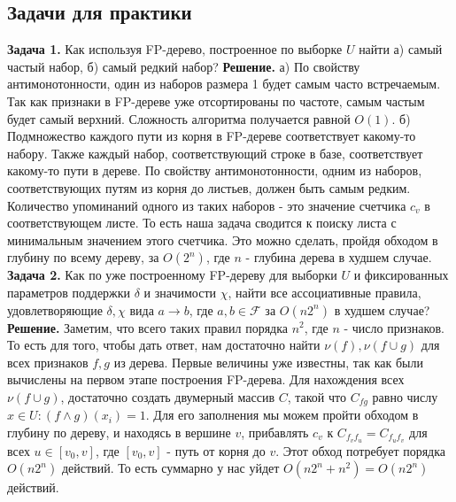 \subsection{Задачи для практики}
\textbf{Задача 1.} Как используя FP-дерево, построенное по выборке $U$ найти а) самый частый набор, б) самый редкий набор?
\newline\newline
\textbf{Решение.}
\newline
а) По свойству антимонотонности, один из наборов размера 1 будет самым часто встречаемым. Так как признаки в FP-дереве уже отсортированы по частоте, самым частым будет самый верхний. Сложность алгоритма получается равной $O(1)$.
\newline
б) Подмножество каждого пути из корня в FP-дереве соответствует какому-то набору. Также каждый набор, соответствующий строке в базе, соответствует какому-то пути в дереве. По свойству антимонотонности, одним из наборов, соответствующих путям из корня до листьев, должен быть самым редким. Количество упоминаний одного из таких наборов - это значение счетчика $c_v$ в соответствующем листе. То есть наша задача сводится к поиску листа с минимальным значением этого счетчика. Это можно сделать, пройдя обходом в глубину по всему дереву, за $O(2^n)$, где $n$ - глубина дерева в худшем случае.
\newline\newline
\textbf{Задача 2.} Как по уже построенному FP-дереву для выборки $U$ и фиксированных параметров поддержки $\delta$ и значимости $\chi$, найти все ассоциативные правила, удовлетворяющие $\delta, \chi$ вида $a \to b$, где $a,b \in \mathcal{F}$ за $O(n2^n)$ в худшем случае?
\newline\newline
\textbf{Решение.}
\newline
Заметим, что всего таких правил порядка $n^2$, где $n$ - число признаков. То есть для того, чтобы дать ответ, нам достаточно найти $\nu(f), \nu(f \cup g)$ для всех признаков $f,g$ из дерева. Первые величины уже известны, так как были вычислены на первом этапе построения FP-дерева. Для нахождения всех $\nu(f \cup g)$, достаточно создать двумерный массив $C$, такой что $C_{fg}$ равно числу $x \in U: (f \wedge g)(x_i) = 1$. Для его заполнения мы можем пройти обходом в глубину по дереву, и находясь в вершине $v$, прибавлять $c_v$ к $C_{f_vf_u} = C_{f_uf_v}$ для всех $u \in [v_0, v]$, где $ [v_0, v]$ - путь от корня до $v$. Этот обход потребует порядка $O(n2^n)$ действий. То есть суммарно у нас уйдет $O(n2^n + n^2) = O(n2^n)$ действий.
